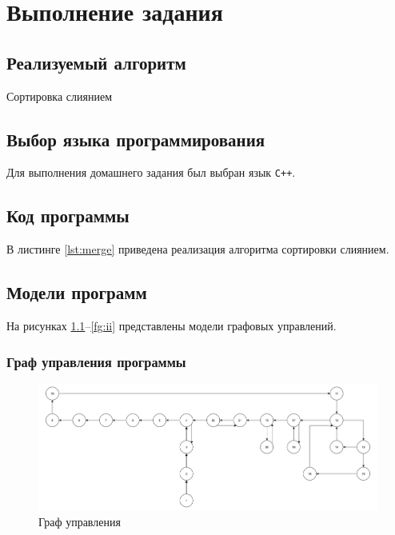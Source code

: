 \chapter{Выполнение задания}

\section{Реализуемый алгоритм}
Сортировка слиянием

\section{Выбор языка программирования}
Для выполнения домашнего задания был выбран язык \texttt{C++}.

\section{Код программы}

В листинге \ref{lst:merge} приведена реализация алгоритма сортировки слиянием.



\section{Модели программ}

На рисунках \ref{fg:mg}--\ref{fg:ii} представлены модели графовых управлений.

\subsection{Граф управления программы}

\begin{figure}[h]
	\centering
	\label{fg:mg}
	\includegraphics[height=0.2\textheight]{img/граф_управления.pdf}
	\caption{Граф управления}
\end{figure}

